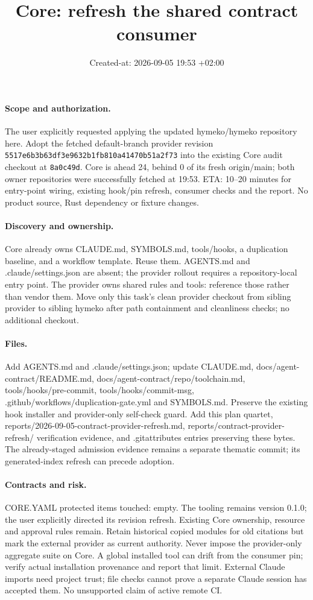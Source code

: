 \documentclass[11pt,a4paper]{article}
\title{Core: refresh the shared contract consumer}
\date{Created-at: 2026-09-05 19:53 +02:00}
\begin{document}
\maketitle
\paragraph{Scope and authorization.}
The user explicitly requested applying the updated hymeko/hymeko repository
here. Adopt the fetched default-branch provider revision
\texttt{5517e6b3b63df3e9632b1fb810a41470b51a2f73} into the existing
Core audit checkout at \texttt{8a0c49d}. Core is ahead 24, behind 0 of its
fresh origin/main; both owner repositories were successfully fetched at 19:53.
ETA: 10--20 minutes for entry-point wiring, existing hook/pin refresh, consumer
checks and the report. No product source, Rust dependency or fixture changes.
\paragraph{Discovery and ownership.}
Core already owns CLAUDE.md, SYMBOLS.md, tools/hooks, a duplication baseline,
and a workflow template. Reuse them. AGENTS.md and .claude/settings.json are
absent; the provider rollout requires a repository-local entry point. The
provider owns shared rules and tools: reference those rather than vendor them.
Move only this task's clean provider checkout from sibling provider to sibling
hymeko after path containment and cleanliness checks; no additional checkout.
\paragraph{Files.}
Add AGENTS.md and .claude/settings.json; update CLAUDE.md,
docs/agent-contract/README.md, docs/agent-contract/repo/toolchain.md,
tools/hooks/pre-commit, tools/hooks/commit-msg,
.github/workflows/duplication-gate.yml and SYMBOLS.md.
Preserve the existing hook installer and provider-only self-check guard.
Add this plan quartet, reports/2026-09-05-contract-provider-refresh.md,
reports/contract-provider-refresh/ verification evidence, and .gitattributes
entries preserving these bytes. The already-staged admission evidence remains
a separate thematic commit; its generated-index refresh can precede adoption.
\paragraph{Contracts and risk.}
CORE.YAML protected items touched: empty. The tooling remains version 0.1.0;
the user explicitly directed its revision refresh. Existing Core ownership,
resource and approval rules remain. Retain historical copied modules for old
citations but mark the external provider as current authority. Never impose the
provider-only aggregate suite on Core. A global installed tool can drift from
the consumer pin; verify actual installation provenance and report that limit.
External Claude imports need project trust; file checks cannot prove a separate
Claude session has accepted them. No unsupported claim of active remote CI.
\end{document}
